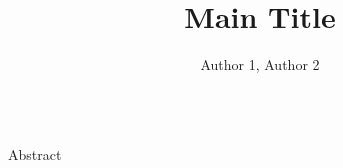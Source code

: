 \documentclass{beamer}
\title[small title]{\texorpdfstring{Main Title}
{Main Title}}
\author{Author 1, Author 2}
\institute{University of Wisconsin-Madison}
\begin{document}
\small

\begin{frame}[t]{}
\vskip -1cm
\begin{columns}

\begin{column}[T]{0.27\textwidth}

\begin{block}{\large Abstract}

\end{block}

\end{column}

\begin{column}[T]{0.72\textwidth}

\begin{columns}[t]

\begin{column}{0.32\textwidth}

\end{column}

\begin{column}{0.42\textwidth}

\end{column}

\begin{column}{0.24\textwidth}

\end{column}

\end{columns}

\begin{columns}[t]

\begin{column}{0.6\textwidth}

\end{column}

\begin{column}{0.4\textwidth}

\end{column}

\end{columns}

\end{column}

\end{columns}

\end{frame}
\end{document}
